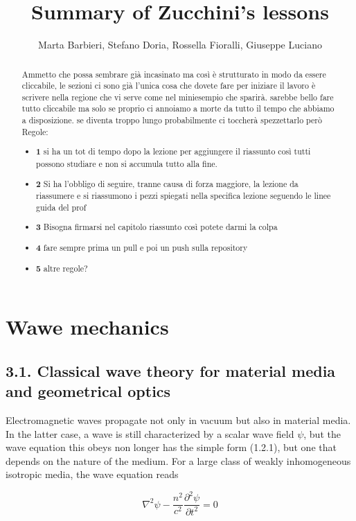 \documentclass{article}
\title{Summary of Zucchini’s lessons}
\author{Marta Barbieri, Stefano Doria, Rossella Fioralli, Giuseppe Luciano}
\begin{document}
\maketitle
\begin{abstract}
    Ammetto che possa sembrare già incasinato ma così è strutturato in modo da essere cliccabile, le sezioni ci sono già l'unica cosa che dovete fare per iniziare il lavoro è scrivere nella regione che vi serve come nel miniesempio che sparirà. sarebbe bello fare tutto cliccabile ma solo se proprio ci annoiamo a morte da tutto il tempo che abbiamo a disposizione. se diventa troppo lungo probabilmente ci toccherà spezzettarlo però
    Regole:
    \begin{itemize}
\item \textbf{1} 
 si ha un tot di tempo dopo la lezione per aggiungere il riassunto così tutti possono studiare e non si accumula tutto alla fine. 
 
\item \textbf{2} 
Si ha l'obbligo di seguire, tranne causa di forza maggiore, la lezione da riassumere e si riassumono i pezzi spiegati nella specifica lezione seguendo le linee guida del prof 
\item \textbf{3}
Bisogna firmarsi nel capitolo riassunto così potete darmi la colpa
\item \textbf{4}
fare sempre prima un pull e poi un push sulla repository
\item \textbf{5}
altre regole?
\end{itemize}
   
\end{abstract}

\tableofcontents
\section*{Wawe mechanics}
\subsection*{3.1. Classical wave theory for material media and geometrical optics}

Electromagnetic waves propagate not only in vacuum but also in material media. In the latter case, a wave is still characterized by a scalar wave field $\psi$, but the wave equation this obeys non longer has the simple form (1.2.1), but one that depends on the nature of the medium. For a large class of weakly inhomogeneous isotropic media, the wave equation reads
 
\begin{equation*}
\nabla^{2} \psi-\frac{n^{2}}{c^{2}} \frac{\partial^{2} \psi}{\partial t^{2}}=0 \tag{3.1.1}
\end{equation*}
 
\end{document}
